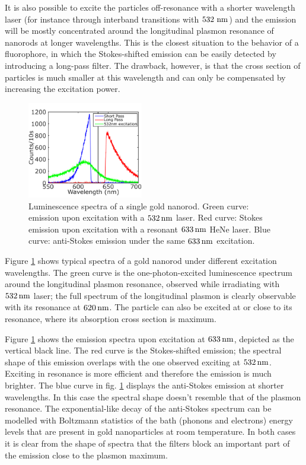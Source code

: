 It is also possible to excite the particles off-resonance with a shorter
wavelength laser (for instance through interband transitions with $532\,\,\textrm{nm}$)
and the emission will be mostly concentrated around the longitudinal plasmon
resonance of nanorods at longer wavelengths. This is the closest situation to
the behavior of a fluorophore, in which the Stokes-shifted emission can be
easily detected by introducing a long-pass filter. The drawback, however, is
that the cross section of particles is much smaller at this wavelength and can
only be compensated by increasing the excitation power.

\begin{figure}[htp] \centering
\includegraphics[width=0.45\textwidth]{Chapters/03_Background_Free/Figures/01_3_Curves/3_curves_final.png}
\caption{Luminescence spectra of a single gold nanorod. Green curve: emission
upon excitation with a $532\,\textrm{nm}$ laser. Red curve: Stokes emission upon
excitation with a resonant $633\,\textrm{nm}$ HeNe laser. Blue curve: anti-Stokes emission
under the same $633\,\textrm{nm}$ excitation.}
	\label{fig:spectra_rod}
\end{figure}

Figure \ref{fig:spectra_rod} shows typical spectra of a gold nanorod under
different excitation wavelengths. The green curve is the one-photon-excited
luminescence spectrum around the longitudinal plasmon resonance, observed while
irradiating with $532\,\textrm{nm}$ laser; the full spectrum of the longitudinal plasmon
is clearly observable with its resonance at $620\,\textrm{nm}$. The particle can also be
excited at or close to its resonance, where its absorption cross section is
maximum. 

Figure \ref{fig:spectra_rod} shows the emission spectra upon excitation at
$633\,\textrm{nm}$, depicted as the vertical black line. The red curve is the
Stokes-shifted emission; the spectral shape of this emission overlaps with the
one observed exciting at $532\,\textrm{nm}$. Exciting in resonance is more efficient and
therefore the emission is much brighter. The blue curve in fig.
\ref{fig:spectra_rod} displays the anti-Stokes emission at shorter wavelengths.
In this case the spectral shape doesn't resemble that of the plasmon resonance.
The exponential-like decay of the anti-Stokes spectrum can be modelled with
Boltzmann statistics\cite{He2015} of the bath (phonons and electrons) energy
levels that are present in gold nanoparticles at room temperature. In both cases
it is clear from the shape of spectra that the filters block an important part of the
emission close to the plasmon maximum.
 
